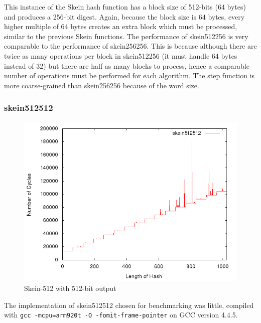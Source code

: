\documentclass[10pt,a4paper]{article}
\begin{document}
This instance of the Skein hash function has a block size of 512-bits (64 bytes) and produces a 256-bit digest.  Again, because the block size is 64 bytes, every higher multiple of 64 bytes creates an extra block which must be processed, similar to the previous Skein functions.  The performance of skein512256 is very comparable to the performance of skein256256.  This is because although there are twice as many operations per block in skein512256 (it must handle 64 bytes instead of 32) but there are half as many blocks to process, hence a comparable number of operations must be performed for each algorithm.  The step function is more coarse-grained than skein256256 because of the word size.

\subsubsection{skein512512}

    \begin{figure}[H]
        \begin{center}
            \includegraphics[scale=0.5]{images/skein512512.png} 
            \caption{Skein-512 with 512-bit output}
        \end{center}
    \end{figure}

The implementation of skein512512 chosen for benchmarking was little, compiled
with \texttt{gcc -mcpu=arm920t -O -fomit-frame-pointer} on GCC version 4.4.5.
\end{document}

